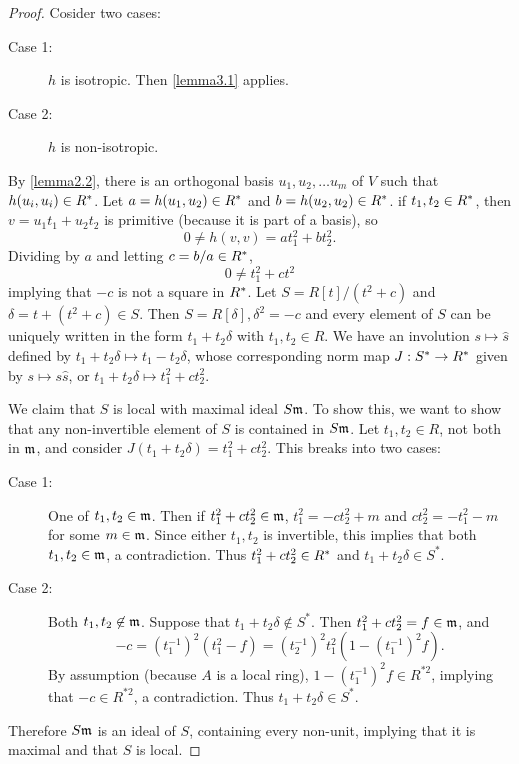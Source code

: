 \begin{proof}
Cosider two cases:
\begin{description}
\item[Case 1:] $h$ is isotropic. Then \ref{lemma3.1} applies.
\item[Case 2:] $h$ is non-isotropic.
\end{description}
By \cref{lemma2.2}, %
there is an orthogonal basis $u_1, u_2, \dotsc u_m$ of $V$ such that $h(u_i, u_i) \in R^*$.
Let $a = h(u_1, u_2) \in R^*$ and $b = h(u_2, u_2) \in R^*$.
if $t_1, t_2 \in R^*$, then $v = u_1 t_1 + u_2 t_2$ is primitive (because it is part of a basis),
so
\[
0 \ne h(v, v) = a t_1^2 + b t_2^2.
\]
Dividing by $a$ and letting $c = b/a \in R^*$,
\[
0 \ne t_1^2 + ct^2
\]
implying that $-c$ is not a square in $R^*$.
Let $S = R[t] / (t^2 + c)$ and $\delta = t + (t^2 + c) \in S$.
Then $S = R[\delta], \delta^2 = -c$ and every element of $S$ can be uniquely written in the form $t_1 + t_2 \delta$ with $t_1, t_2 \in R$.
We have an involution $s \mapsto \hat{s}$ defined by $t_1 + t_2 \delta \mapsto t_1 - t_2 \delta$,
whose corresponding norm map $J: S^* \to R^*$ given by $s \mapsto s \hat{s}$, or $t_1 + t_2 \delta \mapsto t_1^2 + c t_2^2$.

We claim that $S$ is local with maximal ideal $S\mathfrak{m}$.
To show this, we want to show that any non-invertible element of $S$ is contained in $S\mathfrak{m}$.
Let $t_1, t_2 \in R$, not both in $\mathfrak{m}$, and consider $J(t_1 + t_2 \delta) = t_1^2 + c t_2^2$.
This breaks into two cases:
\begin{description}
\item[Case 1:] One of $t_1, t_2 \in \mathfrak{m}$.
Then if $t_1^2 + ct_2^2 \in \mathfrak{m}$, $t_1^2 = -ct_2^2 + m$ and $ct_2^2 = -t_1^2 - m$ for some $m \in \mathfrak{m}$.
Since either $t_1, t_2$ is invertible, this implies that both $t_1, t_2 \in \mathfrak{m}$, a contradiction.
Thus $t_1^2 + c t_2^2 \in R^*$ and $t_1 + t_2 \delta \in S^*$.
\item[Case 2:] Both $t_1, t_2 \not\in \mathfrak{m}$. 
Suppose that $t_1 + t_2 \delta \not \in S^*$.
Then $t_1^2 + ct_2^2 = f \in \mathfrak{m}$, and
\[
-c = (t_1^{-1})^2(t_1^2 - f) = (t_2^{-1})^2 t_1^2(1 - (t_1^{-1})^2f).
\]
By assumption (because $A$ is a local ring), $1 - (t_1^{-1})^2 f \in R^{*2}$, implying that $-c \in R^{*2}$, a contradiction.
Thus $t_1 + t_2 \delta \in S^*$.
\end{description}
Therefore $S\mathfrak{m}$ is an ideal of $S$, containing every non-unit, implying that it is maximal and that $S$ is local.


\end{proof}
